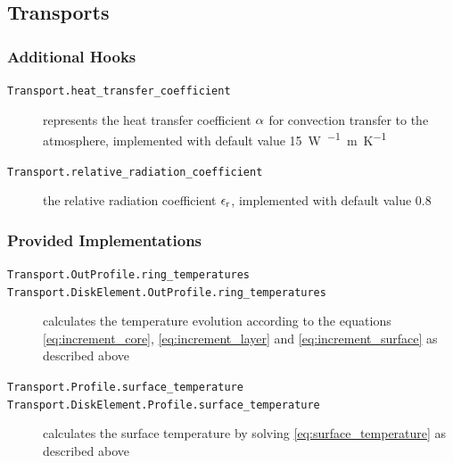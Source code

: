 \documentclass{scrartcl}
\begin{document}
    \subsection{Transports}

    \subsubsection{Additional Hooks}

    \begin{description}
        \item[\texttt{Transport.heat\_transfer\_coefficient}] represents the heat transfer coefficient ${\alpha}$ for convection transfer to the atmosphere, implemented with default value \qty{15}{\watt\per\squared\meter\per\kelvin}
        \item[\texttt{Transport.relative\_radiation\_coefficient}] the relative radiation coefficient ${\epsilon_\mathrm{r}}$, implemented with default value \num{0.8}
    \end{description}

    \subsubsection{Provided Implementations}

    \begin{description}
        \item[\texttt{Transport.OutProfile.ring\_temperatures}]
        \item[\texttt{Transport.DiskElement.OutProfile.ring\_temperatures}] calculates the temperature evolution according to the equations \autoref{eq:increment_core}, \autoref{eq:increment_layer} and \autoref{eq:increment_surface} as described above
        \item[\texttt{Transport.Profile.surface\_temperature}]
        \item[\texttt{Transport.DiskElement.Profile.surface\_temperature}] calculates the surface temperature by solving \autoref{eq:surface_temperature} as described above
    \end{description}

    

    \printbibliography
\end{document}

